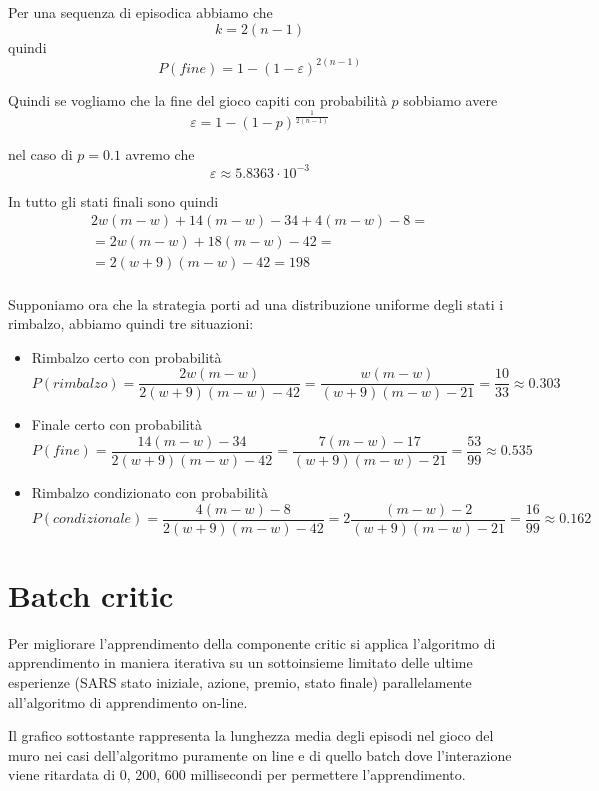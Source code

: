 \documentclass[a4paper,11pt]{article}
\begin{document}
Per una sequenza di episodica abbiamo che \[ k = 2(n-1) \] quindi
\[
P(fine) = 1 - (1 - \varepsilon) ^ {2(n-1)}
\]

Quindi se vogliamo che la fine del gioco capiti con probabilità $ p $ sobbiamo avere
\[
\varepsilon = 1- (1 - p) ^ \frac{1}{2(n-1)}
\]

nel caso di $ p = 0.1 $ avremo che 
\[
\varepsilon \approx 5.8363 \cdot 10^{-3}
\]

In tutto gli stati finali sono quindi 
\[
\begin{array}{r}
 2w(m-w)+14(m-w)-34+4(m-w)-8= \\
 =2w(m-w)+18(m-w)-42= \\
 =2(w+9)(m-w)-42= 198\\
\end{array}
\]

Supponiamo ora che la strategia porti ad una distribuzione uniforme degli stati i rimbalzo, abbiamo quindi tre situazioni:

\begin{itemize}
	\item 	
	Rimbalzo certo con probabilità
	 \[ P(rimbalzo)=\frac{2w(m-w)}{2(w+9)(m-w)-42}
	 =\frac{w(m-w)}{(w+9)(m-w)-21}
	 = \frac{10}{33}\approx0.303
	 \]

	\item 	
	Finale certo con probabilità 
	 \[ P(fine)=\frac{14(m-w)-34}{2(w+9)(m-w)-42}
	 =\frac{7(m-w)-17}{(w+9)(m-w)-21}
	 = \frac{53}{99}\approx0.535
	 \]
	 
	 \item 	
	 Rimbalzo condizionato con probabilità 
	 \[ P(condizionale)=\frac{4(m-w)-8}{2(w+9)(m-w)-42}
	 =2\frac{(m-w)-2}{(w+9)(m-w)-21}
	 = \frac{16}{99}\approx0.162
	 \]
\end{itemize}

\section{Batch critic}

Per migliorare l'apprendimento della componente critic si 
applica l'algoritmo di apprendimento in maniera iterativa su un sottoinsieme limitato delle ultime esperienze (SARS stato iniziale, azione, premio, stato finale) parallelamente all'algoritmo di apprendimento on-line.

Il grafico sottostante rappresenta la lunghezza media degli episodi nel gioco del muro nei casi dell'algoritmo puramente on line e
di quello batch dove l'interazione viene ritardata di 0, 200, 600 millisecondi per permettere l'apprendimento.
\end{document}
